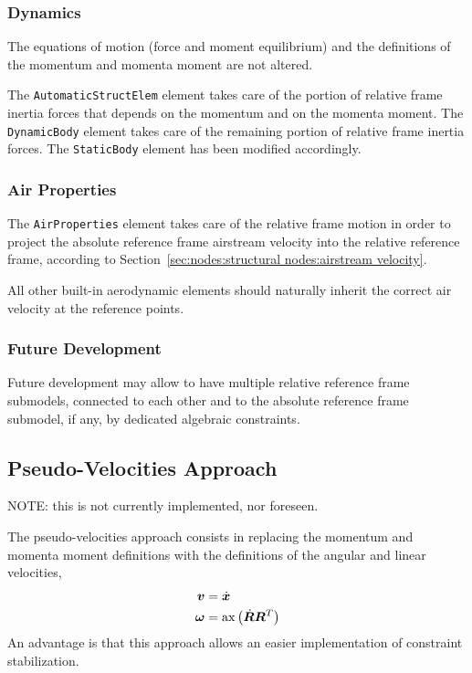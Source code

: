 \documentclass[10pt,dvips,fleqn,subeqn]{report}
\newcommand{\T}[1]{\bm{#1}}
\newcommand{\TT}[1]{\bm{#1}}
\begin{document}
\subsubsection{Dynamics}
The equations of motion (force and moment equilibrium)
and the definitions of the momentum and momenta moment are not altered.

The \texttt{AutomaticStructElem} element takes care of the portion
of relative frame inertia forces that depends on the momentum
and on the momenta moment.
The \texttt{DynamicBody} element takes care of the remaining portion
of relative frame inertia forces.
The \texttt{StaticBody} element has been modified accordingly.

\subsubsection{Air Properties}
The \texttt{AirProperties} element takes care of the relative frame motion
in order to project the absolute reference frame airstream velocity
into the relative reference frame,
according to Section~\ref{sec:nodes:structural nodes:airstream velocity}.

All other built-in aerodynamic elements should naturally inherit
the correct air velocity at the reference points.


\subsubsection{Future Development}
Future development may allow to have multiple relative reference frame
submodels, connected to each other and to the absolute reference frame
submodel, if any, by dedicated algebraic constraints.




\subsection{Pseudo-Velocities Approach}
\label{sec:nodes:structural nodes:pseudo-velocities approach}
NOTE: this is not currently implemented, nor foreseen.

The pseudo-velocities approach consists in replacing the momentum
and momenta moment definitions with the definitions of the angular
and linear velocities,
\begin{subequations}
\begin{align}
	\T{v} &= \dot{\T{x}} \\
	\T{\omega} &= \mathrm{ax}\plbr{\dot{\TT{R}} \TT{R}^T}
\end{align}
\end{subequations}
An advantage is that this approach allows an easier implementation
of constraint stabilization.
\end{document}
